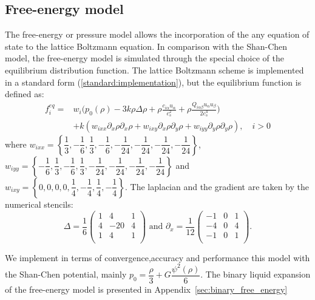 \documentclass[mathpazo]{cicp}
\begin{document}
\subsection{Free-energy model}
The free-energy or pressure model \cite{swift} allows the incorporation of the
any equation of state to the lattice Boltzmann equation. In comparison with the
Shan-Chen model, the free-energy model is simulated through the special choice
of the equilibrium distribution function. The lattice Boltzmann scheme is
implemented in a standard form (\ref{standard:implementation}), but the
equilibrium function is defined as: \begin{equation}
\begin{aligned}
f_i^{eq}=&w_i \biggl(p_0(\rho)-3 k\rho\Delta\rho+\rho \frac{c_{i\alpha}u_{\alpha}}{c_s^2}+\rho \frac{Q_{i\alpha\beta}u_{\alpha}u_{\beta}}{2 c_s^4}\biggr)\\
&+k (w_{ixx} \partial_x \rho \partial_x \rho + w_{ixy} \partial_x \rho \partial_y \rho + w_{iyy} \partial_y \rho \partial_y \rho), \quad i > 0
\end{aligned}
\end{equation}
where $w_{ixx}=\left\{\dfrac{1}{3},-\dfrac{1}{6},\dfrac{1}{3},-\dfrac{1}{6},-\dfrac{1}{24},-\dfrac{1}{24},-\dfrac{1}{24},-\dfrac{1}{24}\right\}$,
$w_{iyy}=\left\{-\dfrac{1}{6},\dfrac{1}{3},-\dfrac{1}{6},\dfrac{1}{3}, -\dfrac{1}{24},-\dfrac{1}{24},-\dfrac{1}{24},-\dfrac{1}{24}\right\}$
and $w_{ixy}=\left\{0,0,0,0,\dfrac{1}{4},-\dfrac{1}{4},\dfrac{1}{4},-\dfrac{1}{4}\right\}$. The laplacian and the gradient are taken by the numerical stencils:
\begin{equation}
\Delta=\frac{1}{6}
\begin{pmatrix}
1&4&1\\
4&-20&4\\
1&4&1\\
\end{pmatrix}\text{ and }
\partial_x=\frac{1}{12}
\begin{pmatrix}
-1&0&1\\
-4&0&4\\
-1&0&1\\
\end{pmatrix}.
\end{equation}

We implement in terms of convergence,accuracy and performance this model with the Shan-Chen potential, mainly $p_0=\dfrac{\rho}{3}+G\dfrac{\psi^2(\rho)}{6}$. The binary liquid expansion of the free-energy model is presented in Appendix~\ref{sec:binary_free_energy}
\end{document}
